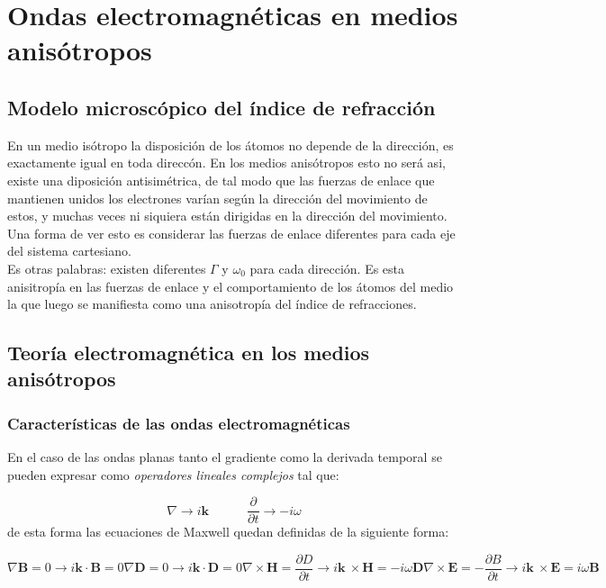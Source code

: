 \documentclass[12pt]{article}
\newcommand{\parciales}[2]{\frac{\partial #1}{\partial #2}}
\newcommand{\tquad}{\quad \quad \quad}
\newcommand{\rota}{\nabla \times}
\newcommand{\Bn}{\mathbf{B}}
\newcommand{\En}{\mathbf{E}}
\newcommand{\Dn}{\mathbf{D}}
\newcommand{\Hn}{\mathbf{H}}
\newcommand{\kn}{\mathbf{k}}
\numberwithin{equation}{section}
\numberwithin{figure}{section}
\begin{document}
\newpage

\section{Ondas electromagnéticas en medios anisótropos}

\subsection{Modelo microscópico del índice de refracción}

En un medio isótropo la disposición de los átomos no depende de la dirección, es exactamente igual en toda direccón. En los medios anisótropos esto no será asi, existe una diposición antisimétrica, de tal modo que las fuerzas de enlace que mantienen unidos los electrones varían según la dirección del movimiento de estos, y muchas veces ni siquiera están dirigidas en la dirección del movimiento. Una forma de ver esto es considerar las fuerzas de enlace diferentes para cada eje del sistema cartesiano. \\

Es otras palabras: existen diferentes $\Gamma$ y $\omega_0$ para cada dirección. Es esta anisitropía en las fuerzas de enlace y el comportamiento de los átomos del medio la que luego se manifiesta como una anisotropía del índice de refracciones. 


\subsection{Teoría electromagnética en los medios anisótropos}

\subsubsection{Características de las ondas electromagnéticas}

En el caso de las ondas planas tanto el gradiente como la derivada temporal se pueden expresar como \textit{operadores lineales complejos} tal que:

\begin{equation}
\nabla \rightarrow  i \kn \tquad \parciales{}{t} \rightarrow - i \omega
\end{equation}
de esta forma las ecuaciones de Maxwell quedan definidas de la siguiente forma:

\begin{subequations}
\begin{equation}
\nabla \Bn = 0 \longrightarrow i \kn \cdot \Bn = 0 \label{Ec:10.2.0.2a}
\end{equation}
\begin{equation}
\nabla \Dn = 0 \longrightarrow i \kn \cdot \Dn = 0
\end{equation}
\begin{equation}
\rota \Hn = \parciales{D}{t} \longrightarrow i \kn \ \times \Hn = - i \omega \Dn
\end{equation}
\begin{equation}
\rota \En = -\parciales{B}{t} \longrightarrow i \kn \ \times \En = i \omega \Bn
\end{equation}
\end{subequations}
\end{document}
